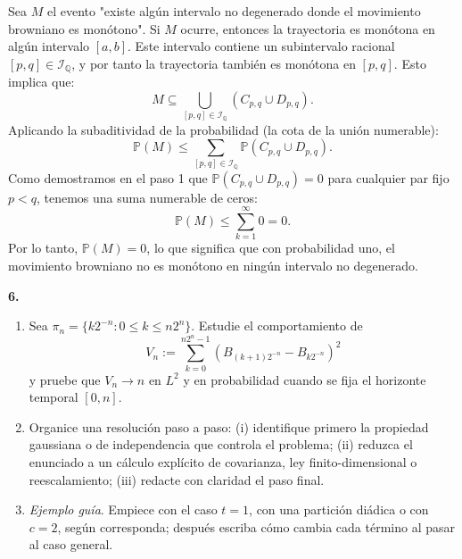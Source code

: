\documentclass[11pt, letterpaper]{article}
\begin{document}
\begin{solucion}
    Sea $M$ el evento "existe algún intervalo no degenerado donde el movimiento browniano es monótono". 
    Si $M$ ocurre, entonces la trayectoria es monótona en algún intervalo $[a,b]$. Este intervalo contiene un subintervalo racional $[p,q] \in \mathcal{I}_\mathbb{Q}$, y por tanto la trayectoria también es monótona en $[p,q]$. Esto implica que:
    \[ M \subseteq \bigcup_{[p,q] \in \mathcal{I}_\mathbb{Q}} (C_{p,q} \cup D_{p,q}). \]
    Aplicando la subaditividad de la probabilidad (la cota de la unión numerable):
    \[ \mathbb{P}(M) \le \sum_{[p,q] \in \mathcal{I}_\mathbb{Q}} \mathbb{P}(C_{p,q} \cup D_{p,q}). \]
    Como demostramos en el paso 1 que $\mathbb{P}(C_{p,q} \cup D_{p,q}) = 0$ para cualquier par fijo $p < q$, tenemos una suma numerable de ceros:
    \[ \mathbb{P}(M) \le \sum_{k=1}^\infty 0 = 0. \]
    Por lo tanto, $\mathbb{P}(M) = 0$, lo que significa que con probabilidad uno, el movimiento browniano no es monótono en ningún intervalo no degenerado.
\end{solucion}

\newpage

\begin{ejercicio}
    \textbf{6.} 
    \begin{enumerate}
        \item Sea $\pi_n = \{k2^{-n} : 0 \le k \le n2^n\}$. Estudie el comportamiento de
        \[ V_n := \sum_{k=0}^{n2^n-1} (B_{(k+1)2^{-n}} - B_{k2^{-n}})^2 \]
        y pruebe que $V_n \to n$ en $L^2$ y en probabilidad cuando se fija el horizonte temporal $[0,n]$.
        \item Organice una resolución paso a paso: (i) identifique primero la propiedad gaussiana o de independencia que controla el problema; (ii) reduzca el enunciado a un cálculo explícito de covarianza, ley finito-dimensional o reescalamiento; (iii) redacte con claridad el paso final.
        \item \textit{Ejemplo guía}. Empiece con el caso $t = 1$, con una partición diádica o con $c = 2$, según corresponda; después escriba cómo cambia cada término al pasar al caso general.
    \end{enumerate}
\end{ejercicio}

\vspace{5mm}
\end{document}

